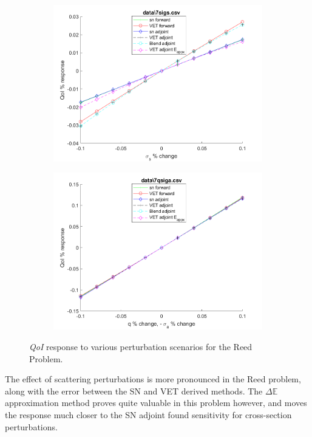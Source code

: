 \documentclass[12pt]{report}
\newcommand{\Edd}{\mathbb{E}}
\newcommand{\qoi}{{\it QoI}\xspace}
\begin{document}
\begin{figure}[H]
\begin{subfigure}{.5\textwidth}
  \includegraphics[width=.98\linewidth]{figures2/7sigsSens.png}
  \label{T4:sfig3}
\end{subfigure}%
\begin{subfigure}{.5\textwidth}
  \centering
  \includegraphics[width=.98\linewidth]{figures2/7qsigaSens.png}
  \label{T4:sfig4}
\end{subfigure}
\caption{\qoi response to various perturbation scenarios for the Reed Problem.}
\end{figure}

The effect of scattering perturbations is more pronounced in the Reed problem, along with the error between the SN and VET derived methods. The $\Delta \Edd$ approximation method proves quite valuable in this problem however, and moves the response much closer to the SN adjoint found sensitivity for cross-section perturbations. 
\end{document}
